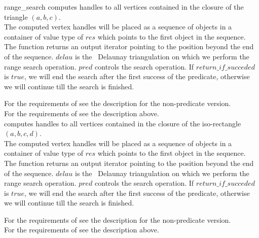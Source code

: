 \begin{ccRefFunction}{range_search}
{computes handles to all vertices contained in the closure of the triangle $(a,b,c)$.\\
The computed vertex handles will be placed as a sequence of objects in a container of value type
of $res$
which points to the first object in the sequence. The function
returns an output iterator pointing to the position beyond the end
of the sequence. 
$delau$ is the \cgal\ Delaunay triangulation on which we perform the range search operation.
$pred$ controls the search operation. If $return\_if\_succeded$ is $true$, we will end the search
after the first success of the predicate, otherwise we will continue till the search is finished.}

For the requirements of  see the description for the non-predicate version.\\
For the requirements of  see the description above. \\

{computes handles to all vertices contained in the closure of the iso-rectangle $(a,b,c,d)$.\\
The computed vertex handles will be placed as a sequence of objects in a container of value type
of $res$
which points to the first object in the sequence. The function
returns an output iterator pointing to the position beyond the end
of the sequence. $delau$ is the \cgal\ Delaunay triangulation on which we perform the range search operation.
$pred$ controls the search operation. If $return\_if\_succeded$ is $true$, we will end the search
after the first success of the predicate, otherwise we will continue till the search is finished.} 

For the requirements of  see the description for the non-predicate version.\\
For the requirements of  see the description above. \\

\end{ccRefFunction}


